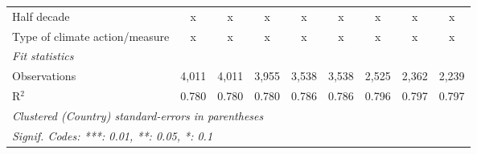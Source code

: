 \begin{tabular}{lcccccccc}
   Half decade                                                               & x             & x             & x             & x             & x             & x            & x             & x\\  
   Type of climate action/measure                                            & x             & x             & x             & x             & x             & x            & x             & x\\  
   \midrule \emph{Fit statistics}\\
   Observations                                                              & 4,011         & 4,011         & 3,955         & 3,538         & 3,538         & 2,525        & 2,362         & 2,239\\  
   R$^2$                                                                     & 0.780         & 0.780         & 0.780         & 0.786         & 0.786         & 0.796        & 0.797         & 0.797\\  
   \midrule
   \multicolumn{9}{l}{\emph{Clustered (Country) standard-errors in parentheses}}\\
   \multicolumn{9}{l}{\emph{Signif. Codes: ***: 0.01, **: 0.05, *: 0.1}}\\
\end{tabular}
\par\endgroup


